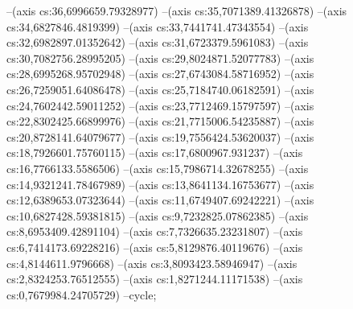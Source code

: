 --(axis cs:36,6996659.79328977)
--(axis cs:35,7071389.41326878)
--(axis cs:34,6827846.4819399)
--(axis cs:33,7441741.47343554)
--(axis cs:32,6982897.01352642)
--(axis cs:31,6723379.5961083)
--(axis cs:30,7082756.28995205)
--(axis cs:29,8024871.52077783)
--(axis cs:28,6995268.95702948)
--(axis cs:27,6743084.58716952)
--(axis cs:26,7259051.64086478)
--(axis cs:25,7184740.06182591)
--(axis cs:24,7602442.59011252)
--(axis cs:23,7712469.15797597)
--(axis cs:22,8302425.66899976)
--(axis cs:21,7715006.54235887)
--(axis cs:20,8728141.64079677)
--(axis cs:19,7556424.53620037)
--(axis cs:18,7926601.75760115)
--(axis cs:17,6800967.931237)
--(axis cs:16,7766133.5586506)
--(axis cs:15,7986714.32678255)
--(axis cs:14,9321241.78467989)
--(axis cs:13,8641134.16753677)
--(axis cs:12,6389653.07323644)
--(axis cs:11,6749407.69242221)
--(axis cs:10,6827428.59381815)
--(axis cs:9,7232825.07862385)
--(axis cs:8,6953409.42891104)
--(axis cs:7,7326635.23231807)
--(axis cs:6,7414173.69228216)
--(axis cs:5,8129876.40119676)
--(axis cs:4,8144611.9796668)
--(axis cs:3,8093423.58946947)
--(axis cs:2,8324253.76512555)
--(axis cs:1,8271244.11171538)
--(axis cs:0,7679984.24705729)
--cycle;

